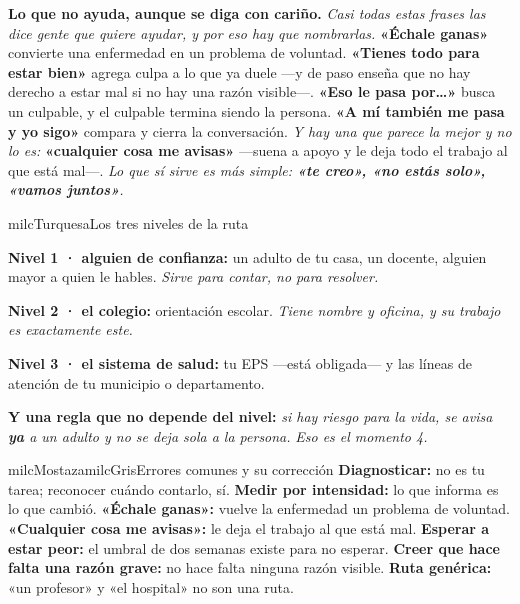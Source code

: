 \documentclass[11pt,letterpaper]{article}
\newcommand{\milcpaso}[3]{%
\Needspace{4\baselineskip}%
\begin{tcolorbox}[enhanced,colback=white,colframe=milcLinea,arc=1.5mm,boxrule=.9pt,
  left=14mm,right=4mm,top=3mm,bottom=3mm,before skip=4pt,after skip=4pt,
  fontupper=\RaggedRight,
  overlay={\node[anchor=north west,circle,fill=#2,text=white,inner sep=0pt,
    minimum size=7.4mm,font=\sffamily\bfseries\small]
    at ([xshift=3.6mm,yshift=-3.2mm]frame.north west) {#1};}]
#3
\end{tcolorbox}}
\begin{document}
\milcpaso{4}{milcTurquesa}{\textbf{Lo que no ayuda, aunque se diga con cariño.} \emph{Casi todas estas frases las dice gente que quiere ayudar, y por eso hay que nombrarlas.} \textbf{«Échale ganas»} convierte una enfermedad en un problema de voluntad. \textbf{«Tienes todo para estar bien»} agrega culpa a lo que ya duele ---y de paso enseña que no hay derecho a estar mal si no hay una razón visible---. \textbf{«Eso le pasa por\ldots»} busca un culpable, y el culpable termina siendo la persona. \textbf{«A mí también me pasa y yo sigo»} compara y cierra la conversación. \emph{Y hay una que parece la mejor y no lo es:} \textbf{«cualquier cosa me avisas»} ---suena a apoyo y le deja todo el trabajo al que está mal---. \emph{Lo que sí sirve es más simple: \textbf{«te creo», «no estás solo», «vamos juntos»}.}}

\begin{drawbox}{milcTurquesa}{Los tres niveles de la ruta}
\begin{pasoslista}
\item \textbf{Nivel 1 · alguien de confianza:} un adulto de tu casa, un docente, alguien mayor a quien le hables. \emph{Sirve para contar, no para resolver.}
\item \textbf{Nivel 2 · el colegio:} orientación escolar. \emph{Tiene nombre y oficina, y su trabajo es exactamente este.}
\item \textbf{Nivel 3 · el sistema de salud:} tu EPS ---está obligada--- y las líneas de atención de tu municipio o departamento.
\item \textbf{Y una regla que no depende del nivel:} \emph{si hay riesgo para la vida, se avisa \textbf{ya} a un adulto y no se deja sola a la persona.} \emph{Eso es el momento 4.}
\end{pasoslista}
\end{drawbox}

\begin{softbox}{milcMostaza}{milcGris}{Errores comunes y su corrección}
\textbf{Diagnosticar:} no es tu tarea; reconocer cuándo contarlo, sí. \textbf{Medir por intensidad:} lo que informa es lo que cambió. \textbf{«Échale ganas»:} vuelve la enfermedad un problema de voluntad. \textbf{«Cualquier cosa me avisas»:} le deja el trabajo al que está mal. \textbf{Esperar a estar peor:} el umbral de dos semanas existe para no esperar. \textbf{Creer que hace falta una razón grave:} no hace falta ninguna razón visible. \textbf{Ruta genérica:} «un profesor» y «el hospital» no son una ruta.
\end{softbox}
\end{document}
